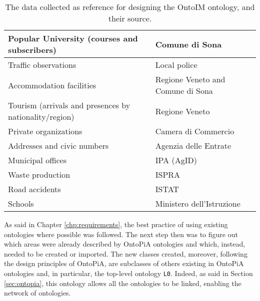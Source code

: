 \begin{table}[!ht]
\begin{tabular}{|p{}|p{}|}
  Popular University (courses and subscribers)                                                                        & Comune di Sona                    \\ \hline
  Traffic observations                                                                                                & Local police                      \\ \hline
  Accommodation facilities                                                                                            & Regione Veneto and Comune di Sona \\ \hline
  Tourism (arrivals and presences by nationality/region)                                                                                                             & Regione Veneto                    \\ \hline
  Private organizations                                                                                               & Camera di Commercio               \\ \hline
  Addresses and civic numbers                                                                                         & Agenzia delle Entrate             \\ \hline
  Municipal offices                                                                                                   & IPA (\ac{AgID})                        \\ \hline
  Waste production                                                                                                    & ISPRA                             \\ \hline
  Road accidents                                                                                                      & ISTAT                             \\ \hline
  Schools                                                                                                             & Ministero dell'Istruzione         \\ \hline
  \end{tabular}
  \caption{The data collected as reference for designing the OntoIM ontology, and their source.}
  \label{tab:data-and-source}
\end{table}

As said in Chapter \ref{chp:requirements}, the best practice of using existing ontologies where possible was followed. The next step then was to figure out which areas were already described by OntoPiA ontologies and which, instead, needed to be created or imported. The new classes created, moreover, following the design principles of OntoPiA, are subclasses of others existing in OntoPiA ontologies and, in particular, the top-level ontology \verb#L0#. Indeed, as said in Section \ref{sec:ontopia}, this ontology allows all the
ontologies to be linked, enabling the network of ontologies.

